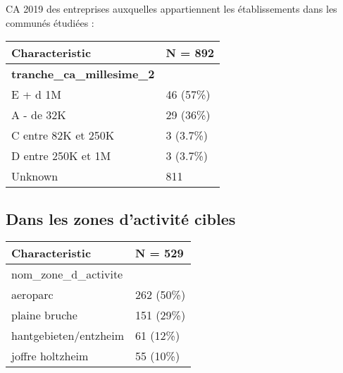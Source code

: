 \documentclass[
  french,
]{article}
\begin{document}
CA 2019 des entreprises auxquelles appartiennent les établissements dans
les communés étudiées :

\begin{longtable}[]{@{}ll@{}}
\toprule
\textbf{Characteristic} & \textbf{N = 892} \\
\midrule
\endhead
\textbf{tranche\_ca\_millesime\_2} & \\
E + d 1M & 46 (57\%) \\
A - de 32K & 29 (36\%) \\
C entre 82K et 250K & 3 (3.7\%) \\
D entre 250K et 1M & 3 (3.7\%) \\
Unknown & 811 \\
\bottomrule
\end{longtable}

\hypertarget{dans-les-zones-dactivituxe9-cibles}{%
\subsection{Dans les zones d'activité
cibles}\label{dans-les-zones-dactivituxe9-cibles}}

\begin{longtable}[]{@{}ll@{}}
\toprule
\textbf{Characteristic} & \textbf{N = 529} \\
\midrule
\endhead
nom\_zone\_d\_activite & \\
aeroparc & 262 (50\%) \\
plaine bruche & 151 (29\%) \\
hantgebieten/entzheim & 61 (12\%) \\
joffre holtzheim & 55 (10\%) \\
\bottomrule
\end{longtable}
\end{document}
